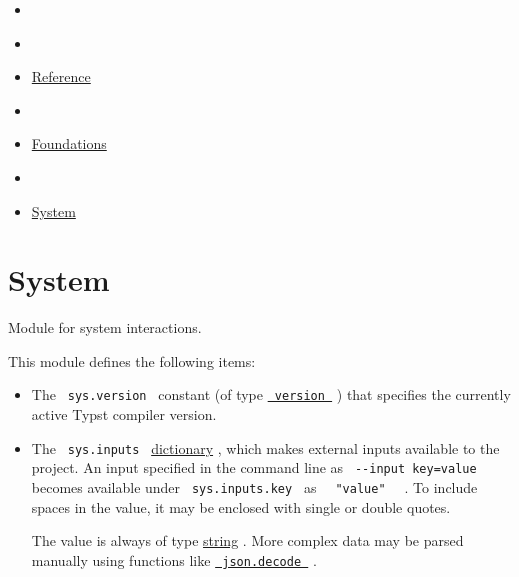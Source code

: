 \begin{itemize}
\tightlist
\item
  \href{/docs}{}
\item
  
\item
  \href{/docs/reference/}{Reference}
\item
  
\item
  \href{/docs/reference/foundations/}{Foundations}
\item
  
\item
  \href{/docs/reference/foundations/sys}{System}
\end{itemize}

\section{System}\label{summary}

Module for system interactions.

This module defines the following items:

\begin{itemize}
\item
  The \texttt{\ sys.version\ } constant (of type
  \href{/docs/reference/foundations/version/}{\texttt{\ version\ }} )
  that specifies the currently active Typst compiler version.
\item
  The \texttt{\ sys.inputs\ }
  \href{/docs/reference/foundations/dictionary/}{dictionary} , which
  makes external inputs available to the project. An input specified in
  the command line as \texttt{\ -\/-input\ key=value\ } becomes
  available under \texttt{\ sys.inputs.key\ } as
  \texttt{\ }{\texttt{\ "value"\ }}\texttt{\ } . To include spaces in
  the value, it may be enclosed with single or double quotes.

  The value is always of type
  \href{/docs/reference/foundations/str/}{string} . More complex data
  may be parsed manually using functions like
  \href{/docs/reference/data-loading/json/\#definitions-decode}{\texttt{\ json.decode\ }}
  .
\end{itemize}

\href{/docs/reference/foundations/style/}{\pandocbounded{}}

